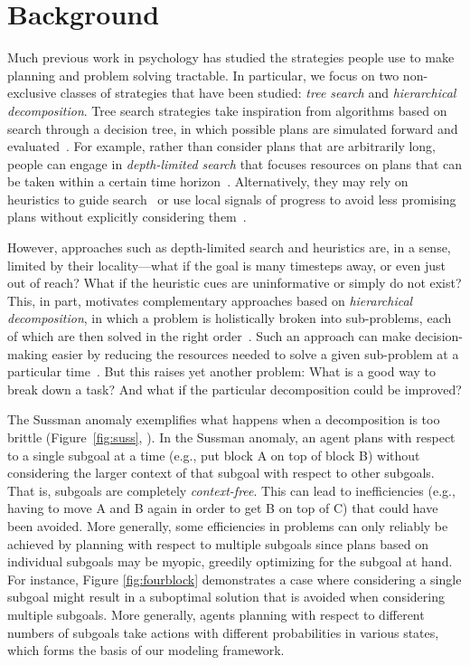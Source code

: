 \documentclass[10pt,letterpaper]{article}
\begin{document}
\section{Background}
Much previous work in psychology has studied the strategies people use to make planning and problem solving tractable. In particular, we focus on two non-exclusive classes of strategies that have been studied: \textit{tree search} and \textit{hierarchical decomposition}. Tree search strategies take inspiration from algorithms based on search through a decision tree, in which possible plans are simulated forward and evaluated~\citep{NewellSimon1972}. For example, rather than consider plans that are arbitrarily long, people can engage in \textit{depth-limited search} that focuses resources on plans that can be taken within a certain time horizon~\citep{MacGregor2001,Keramati2016,Krusche2018}. Alternatively, they may rely on heuristics to guide search~\cite[chap. 5]{Anderson1990} or use local signals of progress to avoid less promising plans without explicitly considering them~\citep{Huys2012}.

However, approaches such as depth-limited search and heuristics are, in a sense, limited by their locality---what if the goal is many timesteps away, or even just out of reach? What if the heuristic cues are uninformative or simply do not exist? This, in part, motivates complementary approaches based on \textit{hierarchical decomposition}, in which a problem is holistically broken into sub-problems, each of which are then solved in the right order~\citep{sacerdoti1974planning, botvinick2012hierarchical}. Such an approach can make decision-making easier by reducing the resources needed to solve a given sub-problem at a particular time~\citep{VanDijk2011, Maisto2015}. But this raises yet another problem: What is a good way to break down a task? And what if the particular decomposition could be improved?

The Sussman anomaly exemplifies what happens when a decomposition is too  brittle (Figure~\ref{fig:suss}, \citealp{Sussman1975}). In the Sussman anomaly, an agent plans with respect to a single subgoal at a time (e.g., put block A on top of block B) without considering the larger context of that subgoal with respect to other subgoals. That is, subgoals are completely \textit{context-free}. This can lead to inefficiencies (e.g., having to move A and B again in order to get B on top of C) that could have been avoided. More generally, some efficiencies in problems can only reliably be achieved by planning with respect to multiple subgoals since plans based on individual subgoals may be myopic, greedily optimizing for the subgoal at hand. For instance, Figure \ref{fig:fourblock} demonstrates a case where considering a single subgoal might result in a suboptimal solution that is avoided when considering multiple subgoals. More generally, agents planning with respect to different numbers of subgoals take actions with different probabilities in various states, which forms the basis of our modeling framework.
\end{document}
